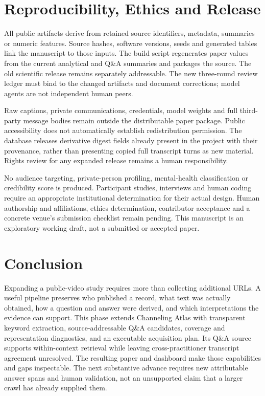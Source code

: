 \section{Reproducibility, Ethics and Release}
All public artifacts derive from retained source identifiers, metadata, summaries or numeric features. Source hashes, software versions, seeds and generated tables link the manuscript to those inputs. The build script regenerates paper values from the current analytical and Q\&A summaries and packages the source. The old scientific release remains separately addressable. The new three-round review ledger must bind to the changed artifacts and document corrections; model agents are not independent human peers.

Raw captions, private communications, credentials, model weights and full third-party message bodies remain outside the distributable paper package. Public accessibility does not automatically establish redistribution permission. The database releases derivative digest fields already present in the project with their provenance, rather than presenting copied full transcript turns as new material. Rights review for any expanded release remains a human responsibility.

No audience targeting, private-person profiling, mental-health classification or credibility score is produced. Participant studies, interviews and human coding require an appropriate institutional determination for their actual design. Human authorship and affiliations, ethics determination, contributor acceptance and a concrete venue's submission checklist remain pending. This manuscript is an exploratory working draft, not a submitted or accepted paper.

\section{Conclusion}
Expanding a public-video study requires more than collecting additional URLs. A useful pipeline preserves who published a record, what text was actually obtained, how a question and answer were derived, and which interpretations the evidence can support. This phase extends Channeling Atlas with transparent keyword extraction, source-addressable Q\&A candidates, coverage and representation diagnostics, and an executable acquisition plan. Its Q\&A source supports within-context retrieval while leaving cross-practitioner transcript agreement unresolved. The resulting paper and dashboard make those capabilities and gaps inspectable. The next substantive advance requires new attributable answer spans and human validation, not an unsupported claim that a larger crawl has already supplied them.

